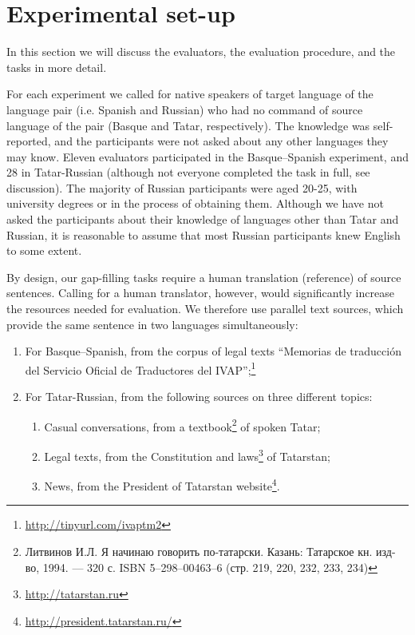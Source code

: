 \documentclass[11pt]{article}
\newcommand{\comment}[1]{}
\newcommand{\rus}[1]{\foreignlanguage{russian}{#1}}
\begin{document}
\section{Experimental set-up}
\label{sec:setup}

In this section we will discuss the evaluators, the evaluation procedure, and the tasks in more detail.

For each experiment we called for native speakers of target language of the language pair (i.e.
Spanish and Russian) who had no command of source language of the pair (Basque
and Tatar, respectively). The knowledge was self-reported, and the participants were not asked about any other languages they may know. \comment{EA 12: should I elaborate on this? Write that Basque is not mutually understandable with anything? I am pretty sure we had no one from Tatarstan, but there may have been someone who knows some Bashkir, which might have helped them. Also, with Tatar, I think, Russian loanwords help more than anything else. } Eleven evaluators participated in the Basque--Spanish experiment, and 28 in Tatar-Russian (although not everyone completed the task
in full, see discussion). The majority of Russian participants were aged 20-25, with university degrees or in the process of obtaining them. Although we have not asked the participants about their knowledge of languages other than Tatar and Russian, it is reasonable to assume that most Russian participants knew English to some extent. \comment{EA 12: could you tell me more about the Spanish evaluators? I would write something similar}

By design, our gap-filling tasks require a human translation (reference) of source sentences. Calling for a human translator, however, would significantly increase the resources needed for evaluation. We therefore use parallel text sources, which provide the same sentence in two languages simultaneously:
\begin{enumerate}
\item  For Basque--Spanish, from the corpus of legal texts ``Memorias de traducci\'on del
Servicio Oficial de Traductores del IVAP'';\footnote{\url{http://tinyurl.com/ivaptm2}} 
\item  For Tatar-Russian, from the following sources on three different topics:
  \begin{enumerate}
    \item  Casual conversations, from a textbook\footnote{\rus{Литвинов И.Л. Я начинаю говорить по-татарски. Казань: Татарское кн. изд-во, 1994. — 320 с. ISBN 5--298--00463--6 (стр. 219, 220, 232, 233, 234)}} of spoken Tatar;
    \item  Legal texts, from the Constitution and laws\footnote{\url{http://tatarstan.ru}} of Tatarstan;
    \item  News, from the President of Tatarstan website\footnote{\url{http://president.tatarstan.ru/}}.
  \end{enumerate}
\end{enumerate}
\end{document}
